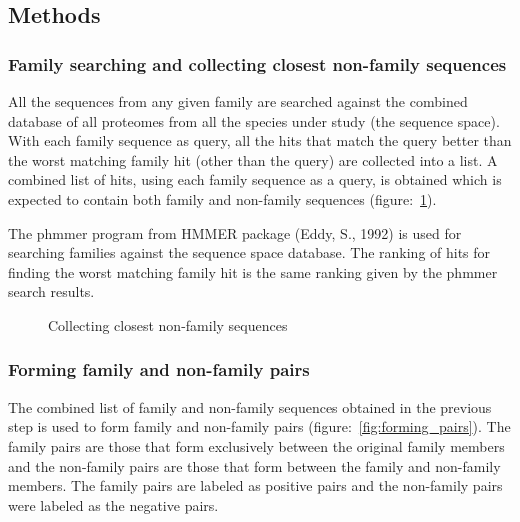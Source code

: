 \documentclass{article}
\begin{document}
		\subsection{Methods}
			\subsubsection{Family searching and collecting closest non-family sequences}
			All the sequences from any given family are searched against the combined database of all proteomes from all the species under study (the sequence space). With each family sequence as query, all the hits that match the query better than the worst matching family hit (other than the query) are collected into a list. A combined list of hits, using each family sequence as a query, is obtained which is expected to contain both family and non-family sequences (figure:~\ref{fig:collecting_non_fam_seqs}).
			
			The phmmer program from HMMER package (Eddy, S., 1992) is used for searching families against the sequence space database. The ranking of hits for finding the worst matching family hit is the same ranking given by the phmmer search results. 
			\begin{figure}
				\caption{Collecting closest non-family sequences}
				\label{fig:collecting_non_fam_seqs}
			\end{figure}
			
			\subsubsection{Forming family and non-family pairs}
			The combined list of family and non-family sequences obtained in the previous step is used to form family and non-family pairs (figure:~\ref{fig:forming_pairs}). The family pairs are those that form exclusively between the original family members and the non-family pairs are those that form between the family and non-family members. The family pairs are labeled as positive pairs and the non-family pairs were labeled as the negative pairs.
			
\end{document}
